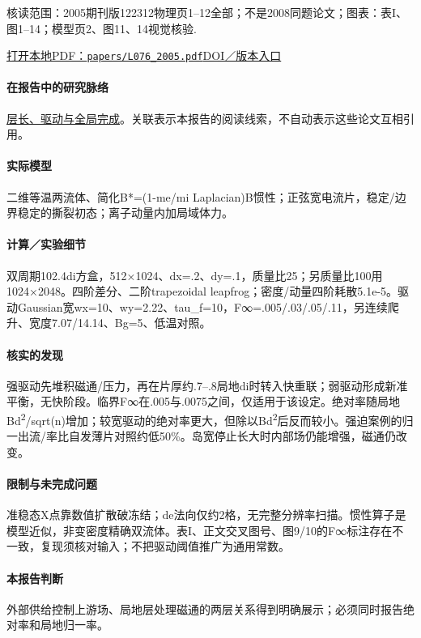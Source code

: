 \documentclass[UTF8,a4paper,11pt,openany,fontset=fandol]{ctexbook}
\begin{document}
\textsf{核读范围：}2005期刊版122312物理页1–12全部；不是2008同题论文；\textsf{图表：}表I、图1–14；模型页2、图11、14视觉核验.

\href{run:../papers/L076_2005.pdf}{打开本地PDF：\texttt{papers/L076\_2005.pdf}}\quad\href{https://doi.org/10.1063/1.2146910}{DOI／版本入口}

\paragraph{在报告中的研究脉络}\hyperref[story:global]{层长、驱动与全局完成}。关联表示本报告的阅读线索，不自动表示这些论文互相引用。

\paragraph{实际模型}二维等温两流体、简化B*=(1-me/mi Laplacian)B惯性；正弦宽电流片，稳定/边界稳定的撕裂初态；离子动量内加局域体力。

\paragraph{计算／实验细节}双周期102.4di方盒，512×1024、dx=.2、dy=.1，质量比25；另质量比100用1024×2048。四阶差分、二阶trapezoidal leapfrog；密度/动量四阶耗散5.1e-5。驱动Gaussian宽wx=10、wy=2.22、tau\_f=10，F∞=.005/.03/.05/.11，另连续爬升、宽度7.07/14.14、Bg=5、低温对照。

\paragraph{核实的发现}强驱动先堆积磁通/压力，再在片厚约.7–.8局地di时转入快重联；弱驱动形成新准平衡，无快阶段。临界F∞在.005与.0075之间，仅适用于该设定。绝对率随局地Bd\textsuperscript{2}/sqrt(n)增加；较宽驱动的绝对率更大，但除以Bd\textsuperscript{2}后反而较小。强迫案例的归一出流/率比自发薄片对照约低50\%。岛宽停止长大时内部场仍能增强，磁通仍改变。

\paragraph{限制与未完成问题}准稳态X点靠数值扩散破冻结；de法向仅约2格，无完整分辨率扫描。惯性算子是模型近似，非变密度精确双流体。表I、正文交叉图号、图9/10的F∞标注存在不一致，复现须核对输入；不把驱动阈值推广为通用常数。

\paragraph{本报告判断}外部供给控制上游场、局地层处理磁通的两层关系得到明确展示；必须同时报告绝对率和局地归一率。
\end{document}
